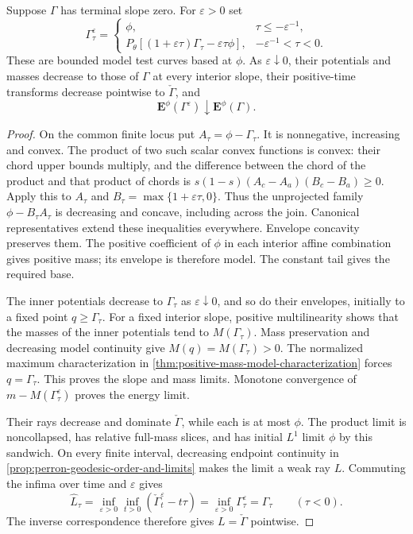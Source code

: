 \begin{lemma}\label{lem:bounded-test-curve-decreasing-approximation}
Suppose $\Gamma$ has terminal slope zero. For $\varepsilon>0$ set
\[
 \Gamma^\varepsilon_\tau=
 \begin{cases}
 \phi,&\tau\leq-\varepsilon^{-1},\\
 P_\theta[(1+\varepsilon\tau)\Gamma_\tau
                         -\varepsilon\tau\phi],&-\varepsilon^{-1}<\tau<0.
 \end{cases}
\]
These are bounded model test curves based at $\phi$. As $\varepsilon\downarrow0$, their potentials and masses decrease to those of $\Gamma$ at every interior slope, their positive-time transforms decrease pointwise to $\check\Gamma$, and
\[
 \mathbf E^\phi(\Gamma^\varepsilon)\downarrow
                                             \mathbf E^\phi(\Gamma).
\]
\end{lemma}
\begin{proof}
\enlargethispage{2\baselineskip}
On the common finite locus put $A_\tau=\phi-\Gamma_\tau$. It is nonnegative, increasing and convex. The product of two such scalar convex functions is convex: their chord upper bounds multiply, and the difference between the chord of the product and that product of chords is
$s(1-s)(A_c-A_a)(B_c-B_a)\geq0$.
Apply this to $A_\tau$ and $B_\tau=\max\{1+\varepsilon\tau,0\}$. Thus the unprojected family $\phi-B_\tau A_\tau$ is decreasing and concave, including across the join. Canonical representatives extend these inequalities everywhere. Envelope concavity preserves them. The positive coefficient of $\phi$ in each interior affine combination gives positive mass; its envelope is therefore model. The constant tail gives the required base.

The inner potentials decrease to $\Gamma_\tau$ as $\varepsilon\downarrow0$, and so do their envelopes, initially to a fixed point $q\geq\Gamma_\tau$. For a fixed interior slope, positive multilinearity shows that the masses of the inner potentials tend to $M(\Gamma_\tau)$. Mass preservation and decreasing model continuity give $M(q)=M(\Gamma_\tau)>0$. The normalized maximum characterization in \cref{thm:positive-mass-model-characterization} forces $q=\Gamma_\tau$. This proves the slope and mass limits. Monotone convergence of $m-M(\Gamma^\varepsilon_\tau)$ proves the energy limit.

Their rays decrease and dominate $\check\Gamma$, while each is at most $\phi$. The product limit is noncollapsed, has relative full-mass slices, and has initial $L^1$ limit $\phi$ by this sandwich. On every finite interval, decreasing endpoint continuity in \cref{prop:perron-geodesic-order-and-limits} makes the limit a weak ray $L$. Commuting the infima over time and $\varepsilon$ gives
\[
 \widehat L_\tau
   =\inf_{\varepsilon>0}\inf_{t>0}
                     (\check\Gamma^\varepsilon_t-t\tau)
   =\inf_{\varepsilon>0}\Gamma^\varepsilon_\tau=\Gamma_\tau
                                  \qquad(\tau<0).
\]
The inverse correspondence therefore gives $L=\check\Gamma$ pointwise.
\end{proof}

